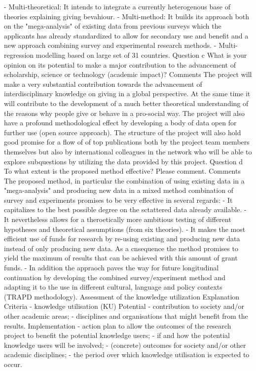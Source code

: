\documentclass[twocolumn, serif, rga, numeric]{jote-article}
\begin{document}
- Multi-theoretical: It intends to integrate a currently heterogenous base of theories explaining giving bevahiour.
- Multi-method: It builds its approach both on the "mega-analysis" of existing data from previous surveys which the applicants has already standardized to allow for secondary use and benefit and a new approach combining survey and experimental research methods.
- Multi-regression modelling based on large set of 31 countries.
Question c
What is your opinion on its potential to make a major contribution to the advancement of scholarship, science or technology (academic impact)?
Comments
The project will make a very substantial contribution towards the advancement of interdisciplinary knowledge on giving in a global perspective. At the same time it will contribute to the development of a much better theoretical understanding of the reasons why people give or behave in a pro-social way. The project will also have a profound methodological effect by developing a body of data open for further use (open source approach). The structure of the project will also hold good promise for a flow of of top publications both by the project team members themselves but also by international colleagues in the network who will be able to explore subquestions by utilizing the data provided by this project.
Question d
To what extent is the proposed method effective? Please comment.
Comments
The proposed method, in particular the combination of using existing data in a "mega-analysis" and producing new data in a mixed method combination of survey and experiments promises to be very effective in several regards:
- It capitalizes to the best possible degree on the sctattered data already available.
- It nevertheless allows for a theroetically more ambitious testing of different hypotheses and theoretical assumptions (from six theories).
- It makes the most efficient use of funds for research by re-using existing and producing new data instead of only producing new data. As a cnsequence the method promises to yield the maximum of results that can be achieved with this amount of grant funds.
- In addition the appraoch paves the way for future longitudinal continuation by developing the combined survey/experiment method and adapting it to the use in different cultural, language and policy contexts (TRAPD methodology).
Assessment of the knowledge utilization
Explanation
Criteria - knowledge utilisation (KU) Potential - contribution to society and/or other academic areas; - disciplines and organisations that might benefit from the results. Implementation - action plan to allow the outcomes of the research project to benefit the potential knowledge users; - if and how the potential knowledge users will be involved; - (concrete) outcomes for society and/or other academic disciplines; - the period over which knowledge utilisation is expected to occur.
\end{document}
